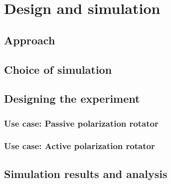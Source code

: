 \documentclass[../report.tex]{subfiles}
\begin{document}
	

\chapter{Design and simulation}

	\section{Approach}

	\section{Choice of simulation}

	\section{Designing the experiment}

		\subsection{Use case: Passive polarization rotator}
	
		\subsection{Use case: Active polarization rotator}
	
	\section{Simulation results and analysis}
	
\end{document}
